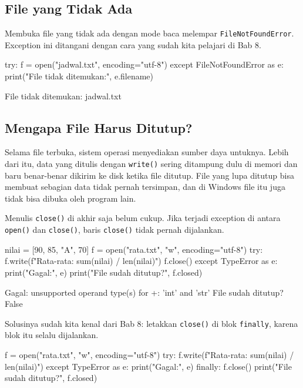 \subsection{File yang Tidak Ada}

Membuka file yang tidak ada dengan mode baca melempar \texttt{FileNotFoundError}. Exception ini ditangani dengan cara yang sudah kita pelajari di Bab 8.

\begin{kode}
try:
    f = open("jadwal.txt", encoding="utf-8")
except FileNotFoundError as e:
    print("File tidak ditemukan:", e.filename)
\end{kode}

\begin{keluaran}
File tidak ditemukan: jadwal.txt
\end{keluaran}

\subsection{Mengapa File Harus Ditutup?}

Selama file terbuka, sistem operasi menyediakan sumber daya untuknya. Lebih dari itu, data yang ditulis dengan \texttt{write()} sering ditampung dulu di memori dan baru benar-benar dikirim ke disk ketika file ditutup. File yang lupa ditutup bisa membuat sebagian data tidak pernah tersimpan, dan di Windows file itu juga tidak bisa dibuka oleh program lain.

Menulis \texttt{close()} di akhir saja belum cukup. Jika terjadi exception di antara \texttt{open()} dan \texttt{close()}, baris \texttt{close()} tidak pernah dijalankan.

\begin{kode}
nilai = [90, 85, "A", 70]
f = open("rata.txt", "w", encoding="utf-8")
try:
    f.write(f"Rata-rata: {sum(nilai) / len(nilai)}\n")
    f.close()
except TypeError as e:
    print("Gagal:", e)
print("File sudah ditutup?", f.closed)
\end{kode}

\begin{keluaran}
Gagal: unsupported operand type(s) for +: 'int' and 'str'
File sudah ditutup? False
\end{keluaran}

Solusinya sudah kita kenal dari Bab 8: letakkan \texttt{close()} di blok \texttt{finally}, karena blok itu selalu dijalankan.

\begin{kode}
f = open("rata.txt", "w", encoding="utf-8")
try:
    f.write(f"Rata-rata: {sum(nilai) / len(nilai)}\n")
except TypeError as e:
    print("Gagal:", e)
finally:
    f.close()
print("File sudah ditutup?", f.closed)
\end{kode}

